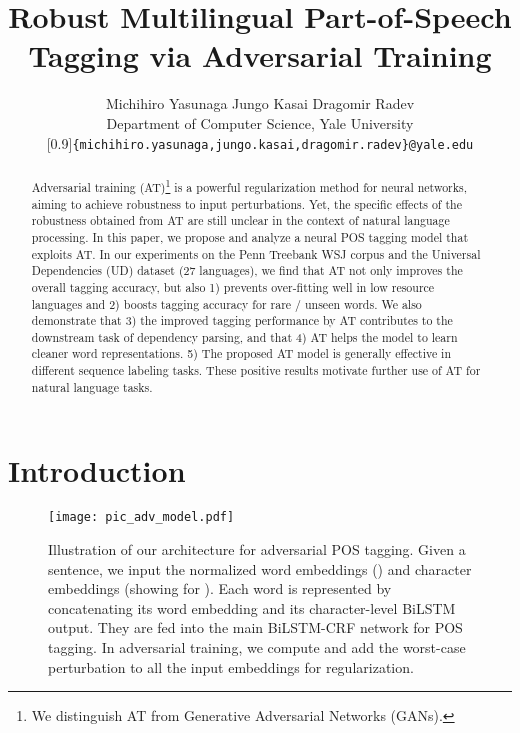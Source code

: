 \documentclass[11pt,a4paper]{article}
\title{Robust Multilingual 
Part-of-Speech Tagging 
via Adversarial Training}
\author{Michihiro Yasunaga \quad\quad\quad Jungo Kasai \quad\quad\quad Dragomir Radev\\
Department of Computer Science, Yale University\\
\scalebox{0.85}[0.9]{{\tt \{michihiro.yasunaga,jungo.kasai,dragomir.radev\}@yale.edu}}}
\date{}
\begin{document}
\setlength{\abovedisplayskip}{4pt}
\setlength{\belowdisplayskip}{4pt}
\setlength{\extrarowheight}{4pt} 



\maketitle


\begin{abstract}
Adversarial training (AT)\footnote{We distinguish AT from  Generative Adversarial Networks (GANs).} 
is a powerful regularization method for neural networks, aiming to achieve robustness to input perturbations.
Yet, the specific effects of the robustness obtained from AT are still unclear
in the context of natural language processing.
In this paper, we propose and analyze a neural POS tagging model that exploits AT.
In our experiments on the Penn Treebank WSJ corpus
and the Universal Dependencies (UD) dataset (27 languages),
we find that AT
not only improves the overall tagging accuracy, but also
1) prevents over-fitting well in low resource languages and
2) boosts tagging accuracy for rare \!/\! unseen words.
We also demonstrate that 3) the improved tagging performance by AT contributes to the downstream task of dependency parsing, and that 4)
AT helps the model to learn cleaner
word representations.
5) The proposed AT model is generally effective in different sequence labeling tasks.
These positive results motivate further use of AT for natural language tasks.
\end{abstract}




\section{Introduction}
\begin{figure}[!h]
    \hspace{-3mm}
    \centering
    \texttt{[image: pic\_adv\_model.pdf]}
    \caption{Illustration of our architecture for adversarial POS tagging.
    Given a sentence, we input the normalized word embeddings () and character embeddings (showing  for ). 
    Each word is represented by concatenating its word embedding and 
    its character-level BiLSTM output.
    They are fed into the main BiLSTM-CRF network for POS tagging.
    In adversarial training, we compute and add the worst-case perturbation  to all the input embeddings for regularization.
    }
    \label{fig:adv_pic}
\vspace{-4mm}
\end{figure}
\end{document}
